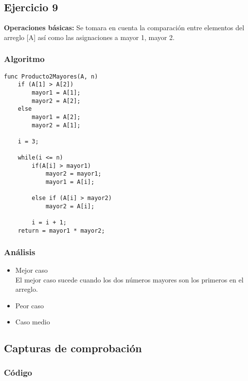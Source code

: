 \documentclass[12pt, letterpaper]{article}			%
\begin{document}
    	\subsection{Ejercicio 9}
			\textbf{Operaciones básicas:} Se tomara en cuenta la comparación entre elementos del arreglo [A] así como las asignaciones a mayor 1, mayor 2. 
			\subsubsection{Algoritmo}
			    \begin{lstlisting}[style=Java]
func Producto2Mayores(A, n)
	if (A[1] > A[2])
		mayor1 = A[1];
		mayor2 = A[2];
	else
		mayor1 = A[2];
		mayor2 = A[1];

	i = 3;

	while(i <= n)
		if(A[i] > mayor1)
			mayor2 = mayor1;
			mayor1 = A[i];

		else if (A[i] > mayor2)
			mayor2 = A[i];

		i = i + 1;
	return = mayor1 * mayor2;
		    \end{lstlisting}

    		\subsubsection{Análisis}
	    		\begin{itemize}
	    			\item[\Checklist] Mejor caso \\
	    			El mejor caso sucede cuando los dos números mayores son los primeros en el arreglo.

	    			\item[\Checklist] Peor caso \\
					
					\item[\Checklist] Caso medio \\

				\end{itemize}

	        \subsection{Capturas de comprobación}

	        \subsubsection{Código}
	            \begin{lstlisting}[style=Java]
    		    \end{lstlisting}
\end{document}
